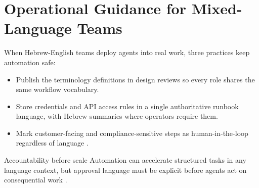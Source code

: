 \section{Operational Guidance for Mixed-Language Teams}
\label{sec:bidi-practical}

When Hebrew-English teams deploy agents into real work, three practices keep automation safe:
\begin{itemize}
  \item Publish the terminology definitions in design reviews so every role shares the same
    workflow vocabulary.
  \item Store credentials and API access rules in a single authoritative runbook language,
    with Hebrew summaries where operators require them.
  \item Mark customer-facing and compliance-sensitive steps as human-in-the-loop regardless
    of language \cite{redditcomplextasks,recomaijobroles}.
\end{itemize}

\begin{warningbox}{Accountability before scale}
Automation can accelerate structured tasks in any language context, but approval language
must be explicit before agents act on consequential work \cite{arxiv2506workagents}.
\end{warningbox}

